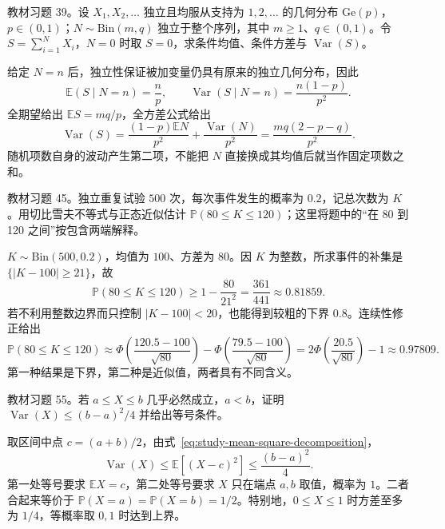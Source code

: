 \begin{example}
\label{ex:study-exercise4-39}
教材习题 39。设 $X_1,X_2,\ldots$ 独立且均服从支持为 $1,2,\ldots$ 的几何分布 $\mathrm{Ge}(p)$，$p\in(0,1)$；$N\sim\mathrm{Bin}(m,q)$ 独立于整个序列，其中 $m\ge1$、$q\in(0,1)$。令 $S=\sum_{i=1}^NX_i$，$N=0$ 时取 $S=0$，求条件均值、条件方差与 $\operatorname{Var}(S)$。
\end{example}

\begin{solve}
给定 $N=n$ 后，独立性保证被加变量仍具有原来的独立几何分布，因此
\[
  \mathbb E(S\mid N=n)=\frac np,\qquad
  \operatorname{Var}(S\mid N=n)=\frac{n(1-p)}{p^2}.
\]
全期望给出 $\mathbb E S=mq/p$，全方差公式给出
\[
  \operatorname{Var}(S)
    =\frac{(1-p)\mathbb E N}{p^2}
      +\frac{\operatorname{Var}(N)}{p^2}
    =\frac{mq(2-p-q)}{p^2}.
\]
随机项数自身的波动产生第二项，不能把 $N$ 直接换成其均值后就当作固定项数之和。
\end{solve}

\begin{example}
\label{ex:study-exercise4-45}
教材习题 45。独立重复试验 $500$ 次，每次事件发生的概率为 $0.2$，记总次数为 $K$。用切比雪夫不等式与正态近似估计 $\mathbb P(80\le K\le120)$；这里将题中的“在 80 到 120 之间”按包含两端解释。
\end{example}

\begin{solve}
$K\sim\mathrm{Bin}(500,0.2)$，均值为 $100$、方差为 $80$。因 $K$ 为整数，所求事件的补集是 $\{|K-100|\ge21\}$，故
\[
  \mathbb P(80\le K\le120)\ge1-\frac{80}{21^2}
    =\frac{361}{441}\approx0.81859.
\]
若不利用整数边界而只控制 $|K-100|<20$，也能得到较粗的下界 $0.8$。连续性修正给出
\[
  \mathbb P(80\le K\le120)
    \approx\Phi\left(\frac{120.5-100}{\sqrt{80}}\right)
      -\Phi\left(\frac{79.5-100}{\sqrt{80}}\right)
    =2\Phi\left(\frac{20.5}{\sqrt{80}}\right)-1
    \approx0.97809.
\]
第一种结果是下界，第二种是近似值，两者具有不同含义。
\end{solve}

\begin{example}
\label{ex:study-exercise4-55}
教材习题 55。若 $a\le X\le b$ 几乎必然成立，$a<b$，证明 $\operatorname{Var}(X)\le(b-a)^2/4$ 并给出等号条件。
\end{example}

\begin{solve}
取区间中点 $c=(a+b)/2$，由式~\eqref{eq:study-mean-square-decomposition}，
\[
  \operatorname{Var}(X)\le\mathbb E[(X-c)^2]\le\frac{(b-a)^2}{4}.
\]
第一处等号要求 $\mathbb E X=c$，第二处等号要求 $X$ 只在端点 $a,b$ 取值，概率为 $1$。二者合起来等价于 $\mathbb P(X=a)=\mathbb P(X=b)=1/2$。特别地，$0\le X\le1$ 时方差至多为 $1/4$，等概率取 $0,1$ 时达到上界。
\end{solve}

